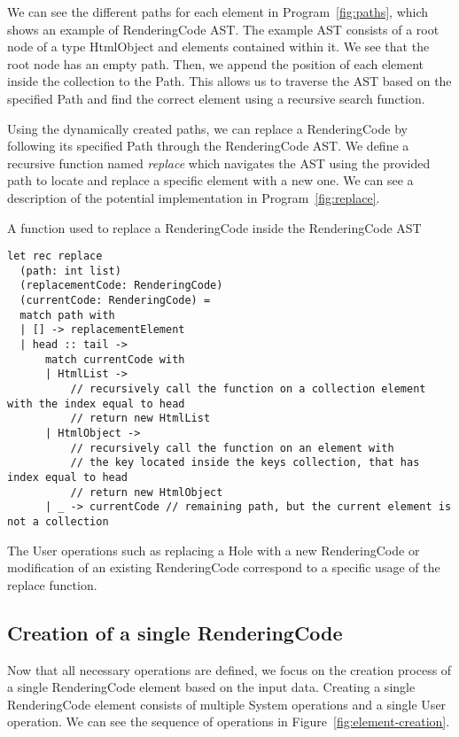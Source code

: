 We can see the different paths for each element in Program~\ref{fig:paths}, which shows an example of RenderingCode AST.
The example AST consists of a root node of a type HtmlObject and elements contained within it.
We see that the root node has an empty path.
Then, we append the position of each element inside the collection to the Path.
This allows us to traverse the AST based on the specified Path and find the correct element using a recursive search function.

Using the dynamically created paths, we can replace a RenderingCode by following its specified Path through the RenderingCode AST.
We define a recursive function named \emph{replace} which navigates the AST using the provided path to locate and replace a specific element with a new one.
We can see a description of the potential implementation in Program~\ref{fig:replace}.

\begin{listing}[htbp]
	\caption {A function used to replace a RenderingCode inside the RenderingCode AST}
	\label{fig:replace}
	\begin{lstlisting}
let rec replace 
  (path: int list) 
  (replacementCode: RenderingCode) 
  (currentCode: RenderingCode) =
  match path with
  | [] -> replacementElement
  | head :: tail ->
      match currentCode with
      | HtmlList ->
          // recursively call the function on a collection element with the index equal to head 
          // return new HtmlList
      | HtmlObject ->
          // recursively call the function on an element with 
          // the key located inside the keys collection, that has index equal to head
          // return new HtmlObject
      | _ -> currentCode // remaining path, but the current element is not a collection
  \end{lstlisting}
\end{listing}

The User operations such as replacing a Hole with a new RenderingCode or modification of an existing RenderingCode correspond to a specific usage of the replace function.

\subsection{Creation of a single RenderingCode}

Now that all necessary operations are defined, we focus on the creation process of a single RenderingCode element based on the input data.
Creating a single RenderingCode element consists of multiple System operations and a single User operation.
We can see the sequence of operations in Figure~\ref{fig:element-creation}.


